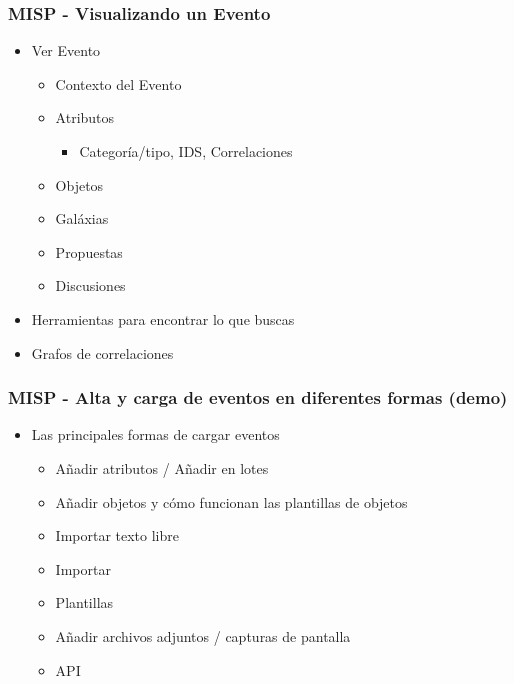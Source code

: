 \begin{frame}
    \frametitle{MISP - Visualizando un Evento}
    \begin{itemize}
     \item Ver Evento
        \begin{itemize}
            \item Contexto del Evento
            \item Atributos
            \begin{itemize}
                \item Categoría/tipo, IDS, Correlaciones
            \end{itemize}
            \item Objetos
            \item Galáxias
            \item Propuestas
            \item Discusiones
        \end{itemize}
    \item Herramientas para encontrar lo que buscas
    \item Grafos de correlaciones
    \end{itemize}
\end{frame}

\begin{frame}
    \frametitle{MISP - Alta y carga de eventos en diferentes formas (demo)}
    \begin{itemize}
    \item Las principales formas de cargar eventos
        \begin{itemize}
            \item Añadir atributos / Añadir en lotes
            \item Añadir objetos y cómo funcionan las plantillas de objetos
            \item Importar texto libre
            \item Importar
            \item Plantillas
            \item Añadir archivos adjuntos / capturas de pantalla
            \item API
        \end{itemize}
    \end{itemize}
\end{frame}

